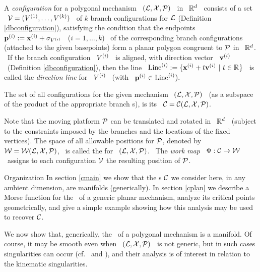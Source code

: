 \begin{defn}\label{dconfiguration}
%
A \emph{configuration} for a polygonal mechanism \ $(\mathcal{L},\mathcal{X},\mathcal{P})$
\ in \ ${\mathbb R}^{d}$ \ consists of a set \ $\mathcal{V}=(V\sp{({1})},\dotsc,V\sp{({k})})$
\ of $k$ branch configurations for $\mathcal{L}$ (Definition
\ref{dbconfiguration}), satisfying the condition that the
endpoints \ $\mathbf{p}\sp{({i})}:=\mathbf{x}\sp{({i})}+\sigma_{V\sp{({i})}}$ \ ($i=1,\dotsc,k$) \
of the corresponding branch configurations (attached to the given
basepoints) form a planar polygon congruent to $\mathcal{P}$ in \
${\mathbb R}^{d}$. \ If the branch configuration \ $V\sp{({i})}$ \ is aligned,
with direction vector \ $\mathbf{v}\sp{({i})}$ \ (Definition
\ref{dbconfiguration}), then the line \
$\Line\up{i}:=\{\xj{i}+t\vj{i}~|\ t\in\RR{}\}$ \ is called the
\emph{direction line} for \ $V\sp{({i})}$ \ (with \
$\mathbf{p}\sp{({i})}\in\operatorname{Line}\sp{({i})}$).

The set of all configurations for the given mechanism \
$(\mathcal{L},\mathcal{X},\mathcal{P})$ \ (as a subspace of the product of
the appropriate branch \cspace s), is its \emph{\cspace} \
$\mathcal{C}=\mathcal{C}(\mathcal{L},\mathcal{X},\mathcal{P})$.
%
\end{defn}

\begin{defn}\label{dwork}
%
Note that the moving platform $\mathcal{P}$ can be translated and rotated
in \ ${\mathbb R}^{d}$ \ (subject to the constraints imposed by the branches
and the locations of the fixed vertices). The space of all allowable
positions for $\mathcal{P}$, denoted by \ $\mathcal{W}=\mathcal{W}(\mathcal{L},\mathcal{X},\mathcal{P})$, \ is called
the \emph{\wspace} for \ $(\mathcal{L},\mathcal{X},\mathcal{P})$. \ The \emph{work map} \
$\Phi:\mathcal{C}\to\mathcal{W}$ \ assigns to each configuration $\mathcal{V}$ the
resulting position of $\mathcal{P}$.
%
\end{defn}

\begin{mysubsection}[\label{sorg}]{Organization}
%
In section \ref{cmain} we show that the \cspace s $\mathcal{C}$ we consider here, in
any ambient dimension, are manifolds (generically). In section
\ref{cplan} we describe a Morse function for the \cspace\ of a generic planar
mechanism, analyze its critical points geometrically, and give a
simple example showing how this analysis may be used to recover $\mathcal{C}$.
%
\end{mysubsection}

%
%
\sect{Generic polygonal mechanisms} \label{cmain}

We now show that, generically, the \cspace\ of a polygonal
mechanism is a manifold. Of course, it may be smooth even when  \
$(\mathcal{L},\mathcal{X},\mathcal{P})$ \ is not generic, but in such cases singularities
can occur (cf.\ \cite{FSchuH} and \cite{KT}), and their analysis
is of interest in relation to the kinematic singularities.

